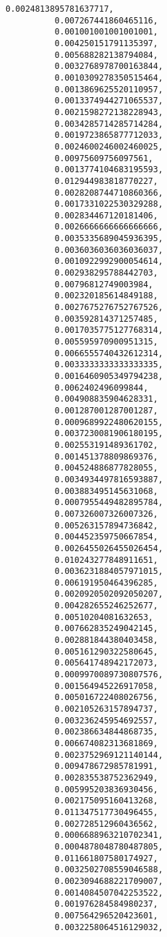\documentclass[11pt]{article}
\begin{document}
\begin{Verbatim}[commandchars=\\\{\}]
          0.0024813895781637717,
          0.007267441860465116,
          0.001001001001001001,
          0.004250151791135397,
          0.005688282138794084,
          0.0032768978700163844,
          0.0010309278350515464,
          0.0013869625520110957,
          0.0013374944271065537,
          0.0021598272138228943,
          0.0034285714285714284,
          0.0019723865877712033,
          0.0024600246002460025,
          0.00975609756097561,
          0.0013774104683195593,
          0.012944983818770227,
          0.0028208744710860366,
          0.0017331022530329288,
          0.002834467120181406,
          0.0026666666666666666,
          0.0035335689045936395,
          0.0036036036036036037,
          0.0010922992900054614,
          0.002938295788442703,
          0.00796812749003984,
          0.002320185614849188,
          0.0027675276752767526,
          0.003592814371257485,
          0.0017035775127768314,
          0.005595970900951315,
          0.0066555740432612314,
          0.0033333333333333335,
          0.0016460905349794238,
          0.0062402496099844,
          0.004908835904628331,
          0.001287001287001287,
          0.0009689922480620155,
          0.0037230081906180195,
          0.002553191489361702,
          0.001451378809869376,
          0.004524886877828055,
          0.0034934497816593887,
          0.003883495145631068,
          0.0007955449482895784,
          0.007326007326007326,
          0.005263157894736842,
          0.004452359750667854,
          0.0026455026455026454,
          0.010243277848911651,
          0.0036231884057971015,
          0.006191950464396285,
          0.0020920502092050207,
          0.004282655246252677,
          0.00510204081632653,
          0.007662835249042145,
          0.002881844380403458,
          0.005161290322580645,
          0.005641748942172073,
          0.0009970089730807576,
          0.001564945226917058,
          0.005016722408026756,
          0.002105263157894737,
          0.003236245954692557,
          0.002386634844868735,
          0.006674082313681869,
          0.0023752969121140144,
          0.009478672985781991,
          0.002835538752362949,
          0.005995203836930456,
          0.002175095160413268,
          0.011347517730496455,
          0.002728512960436562,
          0.0006688963210702341,
          0.0004878048780487805,
          0.011661807580174927,
          0.0032502708559046588,
          0.0023094688221709007,
          0.0014084507042253522,
          0.001976284584980237,
          0.007564296520423601,
          0.0032258064516129032,

\end{Verbatim}
\end{document}
